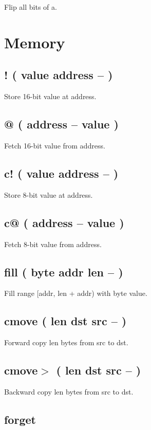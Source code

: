 Flip all bits of a.


\section{Memory}

\subsection{! ( value address -- )}

Store 16-bit value at address.

\subsection{@ ( address -- value )}

Fetch 16-bit value from address.

\subsection{c! ( value address -- )}

Store 8-bit value at address.

\subsection{c@ ( address -- value )}

Fetch 8-bit value from address.

\subsection{fill ( byte addr len -- )}

Fill range [addr, len + addr) with byte value.

\subsection{cmove ( len dst src -- )}

Forward copy len bytes from src to dst.

\subsection{cmove$>$ ( len dst src -- )}

Backward copy len bytes from src to dst.

\subsection{forget}

